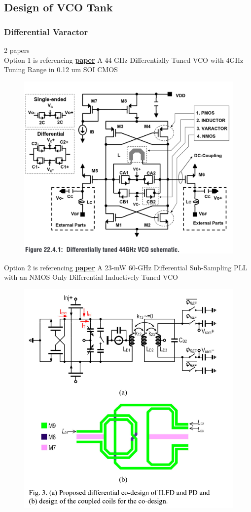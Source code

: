 

\subsection{Design of VCO Tank}


\subsubsection{Differential Varactor}
%
2 papers \\

Option 1 is referencing \href{https://ieeexplore.ieee.org/document/1494046?arnumber=1494046}{\textbf{paper}} A 44 \unit{GHz} Differentially Tuned VCO with 4GHz Tuning Range in 0.12 \unit{um} SOI CMOS


\begin{figure}[ht!]
	\centering
	\includegraphics[width=0.5\linewidth]{Figures/diff-var1.png}
	\label{fig:diff-var1}
\end{figure}

Option 2 is referencing \href{https://ieeexplore.ieee.org/document/9056968}{\textbf{paper}} A 23-mW 60-GHz Differential Sub-Sampling PLL with an NMOS-Only Differential-Inductively-Tuned VCO
\begin{figure}[ht!]
	\centering
	\includegraphics[width=0.5\linewidth]{Figures/diff-var2.png}
	\label{fig:diff-var2}
\end{figure}

